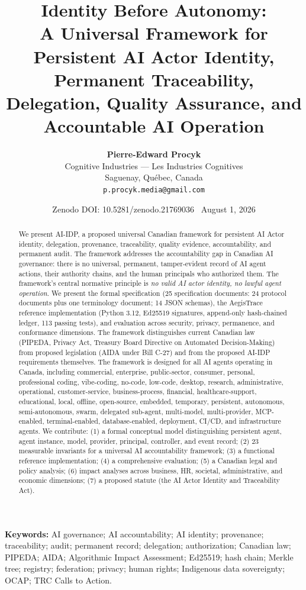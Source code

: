 \documentclass[11pt,a4paper]{article}
\title{\textbf{Identity Before Autonomy: \\ A Universal Framework for Persistent AI Actor Identity, Permanent Traceability, Delegation, Quality Assurance, and Accountable AI Operation}}
\author{
\textbf{Pierre-Edward Procyk}\\
Cognitive Industries --- Les Industries Cognitives\\
Saguenay, Québec, Canada\\
\texttt{p.procyk.media@gmail.com}
}
\date{Zenodo DOI: 10.5281/zenodo.21769036 \ August 1, 2026}
\begin{document}
\maketitle

\begin{abstract}
We present AI-IDP, a proposed universal Canadian framework for persistent AI Actor identity, delegation, provenance, traceability, quality evidence, accountability, and permanent audit. The framework addresses the accountability gap in Canadian AI governance: there is no universal, permanent, tamper-evident record of AI agent actions, their authority chains, and the human principals who authorized them. The framework's central normative principle is \textit{no valid AI actor identity, no lawful agent operation}. We present the formal specification (25 specification documents: 24 protocol documents plus one terminology document; 14 JSON schemas), the AegisTrace reference implementation (Python 3.12, Ed25519 signatures, append-only hash-chained ledger, 113 passing tests), and evaluation across security, privacy, permanence, and conformance dimensions. The framework distinguishes current Canadian law (PIPEDA, Privacy Act, Treasury Board Directive on Automated Decision-Making) from proposed legislation (AIDA under Bill C-27) and from the proposed AI-IDP requirements themselves. The framework is designed for all AI agents operating in Canada, including commercial, enterprise, public-sector, consumer, personal, professional coding, vibe-coding, no-code, low-code, desktop, research, administrative, operational, customer-service, business-process, financial, healthcare-support, educational, local, offline, open-source, embedded, temporary, persistent, autonomous, semi-autonomous, swarm, delegated sub-agent, multi-model, multi-provider, MCP-enabled, terminal-enabled, database-enabled, deployment, CI/CD, and infrastructure agents. We contribute: (1) a formal conceptual model distinguishing persistent agent, agent instance, model, provider, principal, controller, and event record; (2) 23 measurable invariants for a universal AI accountability framework; (3) a functional reference implementation; (4) a comprehensive evaluation; (5) a Canadian legal and policy analysis; (6) impact analyses across business, HR, societal, administrative, and economic dimensions; (7) a proposed statute (the AI Actor Identity and Traceability Act).
\end{abstract}

\noindent\textbf{Keywords:} AI governance; AI accountability; AI identity; provenance; traceability; audit; permanent record; delegation; authorization; Canadian law; PIPEDA; AIDA; Algorithmic Impact Assessment; Ed25519; hash chain; Merkle tree; registry; federation; privacy; human rights; Indigenous data sovereignty; OCAP; TRC Calls to Action.
\end{document}
